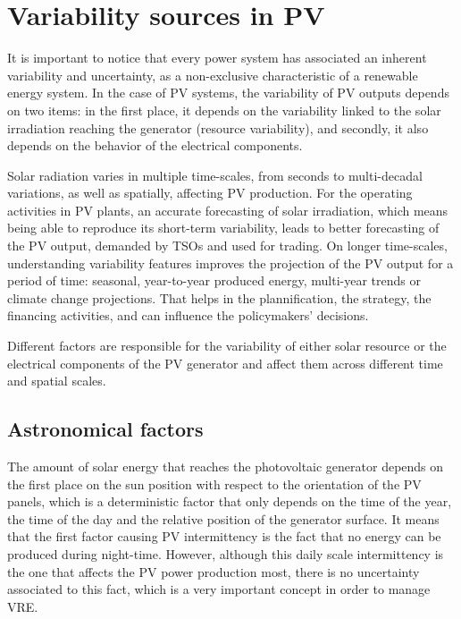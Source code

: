 \section{Variability sources in PV}

It is important to notice that every power system has associated an inherent variability and uncertainty, as a non-exclusive characteristic of a renewable energy system. In the case of PV systems, the variability of PV outputs depends on two items: in the first place, it depends on the variability linked to the solar irradiation reaching the generator (resource variability), and secondly, it also depends on the behavior of the electrical components.   

Solar radiation varies in multiple time-scales, from seconds to multi-decadal variations, as well as spatially, affecting PV production. For the operating activities in PV plants, an accurate forecasting of solar irradiation, which means being able to reproduce its short-term variability, leads to better forecasting of the PV output, demanded by TSOs and used for trading. On longer time-scales, understanding variability features improves the projection of the PV output for a period of time: seasonal, year-to-year produced energy, multi-year trends or climate change projections. That helps in the plannification, the strategy, the financing activities, and can influence the policymakers' decisions.

Different factors are responsible for the variability of either solar resource or the electrical components of the PV generator and affect them across different time and spatial scales.

\subsection{Astronomical factors}

The amount of solar energy that reaches the photovoltaic generator depends on the first place on the sun position with respect to the orientation of the PV panels, which is a deterministic factor that only depends on the time of the year, the time of the day and the relative position of the generator surface. It means that the first factor causing PV intermittency is the fact that no energy can be produced during night-time. However, although this daily scale intermittency is the one that affects the PV power production most, there is no uncertainty associated to this fact, which is a very important concept in order to manage VRE.

